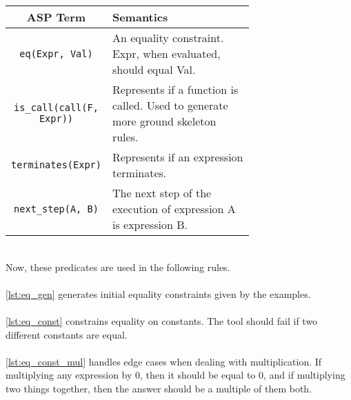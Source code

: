 \begin{center}
\begin{tabular}{| c | m{0.7\linewidth} |}
\hline
\textbf{ASP Term} & \textbf{Semantics} \\
\hline
\lstinline!eq(Expr, Val)! 
&
\mbox{}\newline
An equality constraint. Expr, when evaluated, should equal Val. \newline
\\
\hline
\lstinline!is_call(call(F, Expr))!
&
\mbox{}\newline
Represents if a function is called. Used to generate more ground skeleton rules. \newline
\\
\hline
\lstinline!terminates(Expr)! 
&
\mbox{}\newline
Represents if an expression terminates. \newline
\\
\hline
\lstinline!next_step(A, B)!
&
\mbox{}\newline
The next step of the execution of expression A is expression B.\newline
\\
\hline
\end{tabular}
\end{center}
\mbox{}\\
Now, these predicates are used in the following rules. \\

 
\mbox{} \\
\ref{lst:eq_gen} generates initial equality constraints given by the examples.  \\

 
\mbox{} \\
\ref{lst:eq_const} constrains equality on constants. The tool should fail if two different constants are equal. \\

 
\mbox{} \\
\ref{lst:eq_const_mul} handles edge cases when dealing with multiplication. If multiplying any expression by 0, then it should be equal to 0, and if multiplying two things together, then the answer should be a multiple of them both. \\

